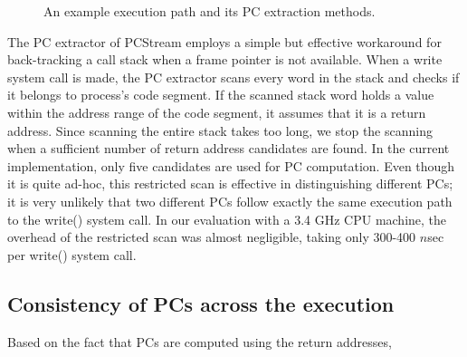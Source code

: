 \begin{figure}[t]
	\centering
	\hfill
	\caption{An example execution path and its PC extraction methods.}
	\label{fig:getpc}
\end{figure}

The PC extractor of \textsf{\small PCStream} employs a simple but effective
workaround for back-tracking a call stack when a frame pointer is not
available.  When a write system call is made, the PC extractor scans every word
in the stack and checks if it belongs to process's code segment.  If the
scanned stack word holds a value within the address range of the code segment,
it assumes that it is a return address.  Since scanning the entire stack takes
too long, we stop the scanning when a sufficient number of return address
candidates are found. In the current implementation, only five candidates are
used for PC computation.  Even though it is quite ad-hoc, this restricted scan
is effective in distinguishing different PCs; it is very unlikely that two
different PCs follow exactly the same execution path to the \textsf{\small
write()} system call.  In our evaluation with a 3.4 GHz CPU machine, the
overhead of the restricted scan was almost negligible, taking only 300-400
$n$sec per \textsf{\small write()} system call.





\subsection{Consistency of PCs across the execution}
Based on the fact that PCs are computed using the return addresses, 






